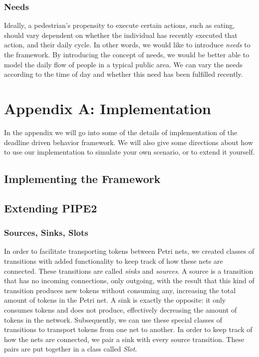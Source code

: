 \documentclass[11pt]{book}
\begin{document}
\subsubsection{Needs}
Ideally, a pedestrian's propensity to execute certain actions, such as eating, should vary dependent on whether the individual has recently executed that action, and their daily cycle. In other words, we would like to introduce \emph{needs} to the framework. By introducing the concept of needs, we would be better able to model the daily flow of people in a typical public area. We can vary the needs according to the time of day and whether this need has been fulfilled recently.

\appendix

\section{Appendix A: Implementation}
In the appendix we will go into some of the details of implementation of the deadline driven behavior framework. We will also give some directions about how to use our implementation to simulate your own scenario, or to extend it yourself.


\subsection{Implementing the Framework}


\subsection{Extending PIPE2}

\subsubsection{Sources, Sinks, Slots}
In order to facilitate transporting tokens between Petri nets, we created classes of transitions with added functionality to keep track of how these nets are connected. These transitions are called \emph{sinks} and \emph{sources}. A source is a transition that has no incoming connections, only outgoing, with the result that this kind of transition produces new tokens without consuming any, increasing the total amount of tokens in the Petri net. A sink is exactly the opposite: it only consumes tokens and does not produce, effectively decreasing the amount of tokens in the network. Subsequently, we can use these special classes of transitions to transport tokens from one net to another. In order to keep track of how the nets are connected, we pair a sink with every source transition. These pairs are put together in a class called \emph{Slot}.
\end{document}
